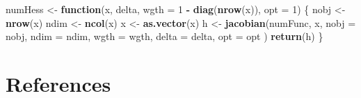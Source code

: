 \documentclass[
  12pt,
]{article}
\newenvironment{Shaded}{\begin{snugshade}}{\end{snugshade}}
\newcommand{\AttributeTok}[1]{\textcolor[rgb]{0.13,0.29,0.53}{#1}}
\newcommand{\ControlFlowTok}[1]{\textcolor[rgb]{0.13,0.29,0.53}{\textbf{#1}}}
\newcommand{\DecValTok}[1]{\textcolor[rgb]{0.00,0.00,0.81}{#1}}
\newcommand{\FunctionTok}[1]{\textcolor[rgb]{0.13,0.29,0.53}{\textbf{#1}}}
\newcommand{\NormalTok}[1]{#1}
\newcommand{\OtherTok}[1]{\textcolor[rgb]{0.56,0.35,0.01}{#1}}
\newcommand{\SpecialCharTok}[1]{\textcolor[rgb]{0.81,0.36,0.00}{\textbf{#1}}}
\begin{document}
\begin{Shaded}
\begin{Highlighting}[]
\NormalTok{numHess }\OtherTok{\textless{}{-}} \ControlFlowTok{function}\NormalTok{(x, delta, }\AttributeTok{wgth =} \DecValTok{1} \SpecialCharTok{{-}} \FunctionTok{diag}\NormalTok{(}\FunctionTok{nrow}\NormalTok{(x)), }\AttributeTok{opt =} \DecValTok{1}\NormalTok{) \{}
\NormalTok{  nobj }\OtherTok{\textless{}{-}} \FunctionTok{nrow}\NormalTok{(x)}
\NormalTok{  ndim }\OtherTok{\textless{}{-}} \FunctionTok{ncol}\NormalTok{(x)}
\NormalTok{  x }\OtherTok{\textless{}{-}} \FunctionTok{as.vector}\NormalTok{(x)}
\NormalTok{  h }\OtherTok{\textless{}{-}} \FunctionTok{jacobian}\NormalTok{(numFunc, x, }\AttributeTok{nobj =}\NormalTok{ nobj, }\AttributeTok{ndim =}\NormalTok{ ndim, }\AttributeTok{wgth =}\NormalTok{ wgth, }\AttributeTok{delta =}\NormalTok{ delta, }\AttributeTok{opt =}\NormalTok{ opt )}
  \FunctionTok{return}\NormalTok{(h)}
\NormalTok{\}}
\end{Highlighting}
\end{Shaded}

\section*{References}\label{references}
\end{document}
